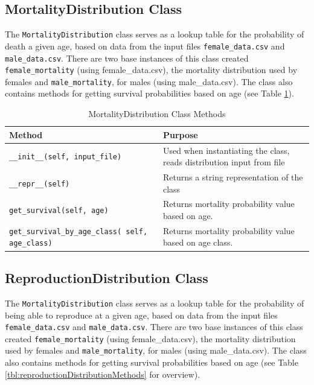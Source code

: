 \documentclass[authoryearcitations]{UoYCSproject}
\begin{document}
\subsection{MortalityDistribution Class}
The \texttt{MortalityDistribution} class serves as a lookup table for the probability of death a given age, based on data from the input files \texttt{female\_data.csv} and \texttt{male\_data.csv}. There are two base instances of this class created \texttt{female\_mortality} (using female\_data.csv), the mortality distribution used by females and \texttt{male\_mortality}, for males (using male\_data.csv). The class also contains methods for getting survival probabilities based on age (see Table \ref{tbl:mortalityDistributionMethods}).

\begin{table}[h]
\caption{MortalityDistribution Class Methods}
\label{tbl:mortalityDistributionMethods}
\begin{tabular}{m{} m{}}
\textbf{Method} & \textbf{Purpose} \\\hline
\texttt{\_\_init\_\_(self, input\_file)} & Used when instantiating the class, reads distribution input from file\\\hline
\texttt{\_\_repr\_\_(self)} & Returns a string representation of the class \\\hline
\texttt{get\_survival(self, age)} & Returns mortality probability value based on age.\\\hline
\texttt{get\_survival\_by\_age\_class( self, age\_class)} &  Returns mortality probability value based on age class.
\end{tabular}
\end{table}

\subsection{ReproductionDistribution Class}
The \texttt{MortalityDistribution} class serves as a lookup table for the probability of being able to reproduce at a given age, based on data from the input files \texttt{female\_data.csv} and \texttt{male\_data.csv}. There are two base instances of this class created \texttt{female\_mortality} (using female\_data.csv), the mortality distribution used by females and \texttt{male\_mortality}, for males (using male\_data.csv). The class also contains methods for getting survival probabilities based on age (see Table \ref{tbl:reproductionDistributionMethods} for overview).
\end{document}
